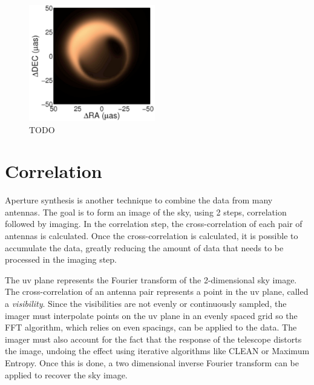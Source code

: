\begin{figure}
  \centering
    \includegraphics[width=0.49\textwidth]{Images/C2/eht.pdf}
  \caption{TODO}
  \label{fig: C2/eht.pdf}
\end{figure}

\cite{2012Sci...338..355D}

\section{Correlation}
\label{Real Time Radio Astronomy Algorithms:Correlation}
Aperture synthesis is another technique to combine the data from many antennas.
The goal is to form an image of the sky, using 2 steps, correlation followed by imaging.
In the correlation step, the cross-correlation of each pair of antennas is calculated. 
Once the cross-correlation is calculated, it is possible to accumulate the data, greatly reducing the amount of data that needs to be processed in the imaging step.

\cite{Thompson:1986ww}

The uv plane represents the Fourier transform of the 2-dimensional sky image. 
The cross-correlation of an antenna pair represents a point in the uv plane, called a \emph{visibility}. 
Since the visibilities are not evenly or continuously sampled, the imager must interpolate points on the uv plane in an evenly spaced grid so the FFT algorithm, which relies on even spacings, can be applied to the data. 
The imager must also account for the fact that the response of the telescope distorts the image, undoing the effect using iterative algorithms like CLEAN or Maximum Entropy. 
Once this is done, a two dimensional inverse Fourier transform can be applied to recover the sky image. 

